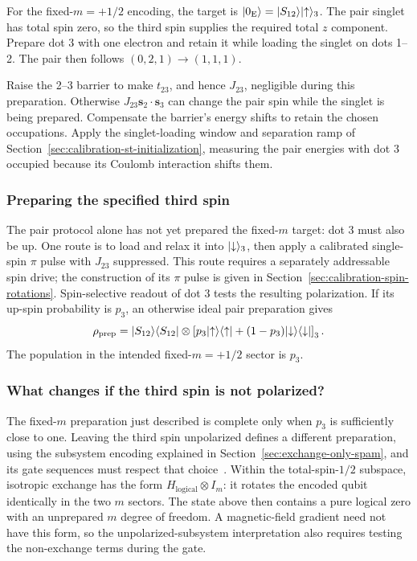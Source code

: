 For the fixed-$m=+1/2$ encoding, the target is
$\lvert 0_{\mathrm E}\rangle=\lvert S_{12}\rangle\lvert \uparrow\rangle_3$.
The pair singlet has total spin zero, so the third spin supplies
the required total $z$ component. Prepare dot 3 with one electron
and retain it while loading the singlet on dots 1--2. The pair
then follows $(0,2,1)\rightarrow(1,1,1)$.

Raise the 2--3 barrier to make $t_{23}$, and hence $J_{23}$,
negligible during this preparation. Otherwise
$J_{23}\mathbf s_2\cdot\mathbf s_3$ can change the pair spin while
the singlet is being prepared. Compensate the barrier's energy
shifts to retain the chosen occupations. Apply the singlet-loading
window and separation ramp of
Section~\ref{sec:calibration-st-initialization}, measuring the
pair energies with dot 3 occupied because its Coulomb interaction
shifts them.

\subsubsection{Preparing the specified third spin}
The pair protocol alone has not yet prepared the fixed-$m$ target:
dot 3 must also be up. One route is to
load and relax it into $\lvert \downarrow\rangle_3$, then apply a calibrated
single-spin $\pi$ pulse with $J_{23}$ suppressed. This route requires
a separately addressable spin drive; the construction of its
$\pi$ pulse is given in Section~\ref{sec:calibration-spin-rotations}.
Spin-selective readout of dot 3 tests the resulting polarization.
If its up-spin probability is $p_3$, an otherwise ideal pair preparation gives
\begin{equation}
 \rho_{\mathrm{prep}}
 =\ket{S_{12}}\bra{S_{12}}\otimes
  \left[p_3\ket{\uparrow}\bra{\uparrow}
       +(1-p_3)\ket{\downarrow}\bra{\downarrow}\right]_3.
 \label{eq:calibration-eo-preparation-state}
\end{equation}
The population in the intended fixed-$m=+1/2$ sector is $p_3$.

\subsubsection{What changes if the third spin is not polarized?}
The fixed-$m$ preparation just described is complete only when $p_3$
is sufficiently close to one. Leaving the third spin unpolarized
defines a different preparation, using the subsystem encoding
explained in
Section~\ref{sec:exchange-only-spam}, and its gate sequences must
respect that choice~\cite{Blumoff2022,Weinstein2023}.
Within the total-spin-$1/2$ subspace, isotropic exchange has the
form $H_{\mathrm{logical}}\otimes I_m$: it rotates the encoded
qubit identically in the two $m$ sectors. The state above then
contains a pure logical zero with an unprepared $m$ degree of
freedom. A magnetic-field gradient need not have this form, so the
unpolarized-subsystem interpretation also requires testing the
non-exchange terms during the gate.
